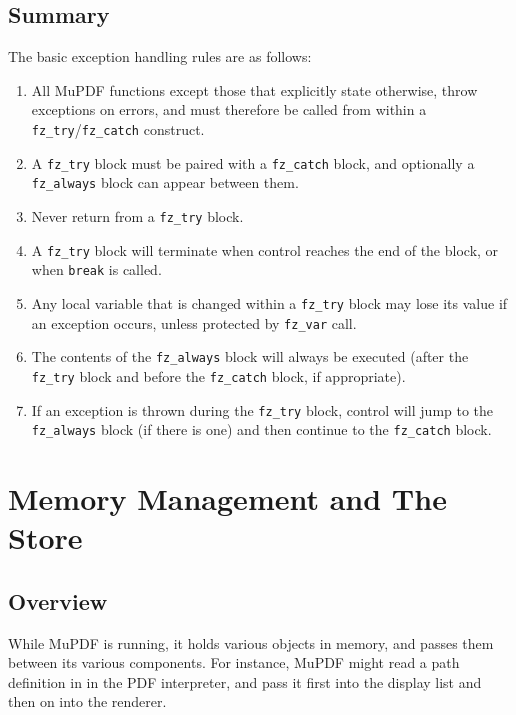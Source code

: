 \documentclass[oneside]{book}
\begin{document}
\section{Summary}
\label{ExceptionRules}

The basic exception handling rules are as follows:

\begin{enumerate}
\item All MuPDF functions except those that explicitly state otherwise, throw exceptions on errors, and must therefore be called from within a \texttt{fz\_try}\slash \texttt{fz\_catch} construct.
\item A \texttt{fz\_try} block must be paired with a \texttt{fz\_catch} block, and optionally a \texttt{fz\_always} block can appear between them.
\item Never return from a \texttt{fz\_try} block.
\item A \texttt{fz\_try} block will terminate when control reaches the end of the block, or when \texttt{break} is called.
\item Any local variable that is changed within a \texttt{fz\_try} block may lose its value if an exception occurs, unless protected by \texttt{fz\_var} call.
\item The contents of the \texttt{fz\_always} block will always be executed (after the \texttt{fz\_try} block and before the \texttt{fz\_catch} block, if appropriate).
\item If an exception is thrown during the \texttt{fz\_try} block, control will jump to the \texttt{fz\_always} block (if there is one) and then continue to the \texttt{fz\_catch} block.
\end{enumerate}



\chapter{Memory Management and The Store}
\label{MemoryManagement}

\section{Overview}

While MuPDF is running, it holds various objects in memory, and passes them between its various components. For instance, MuPDF might read a path definition in in the PDF interpreter, and pass it first into the display list and then on into the renderer.
\end{document}
